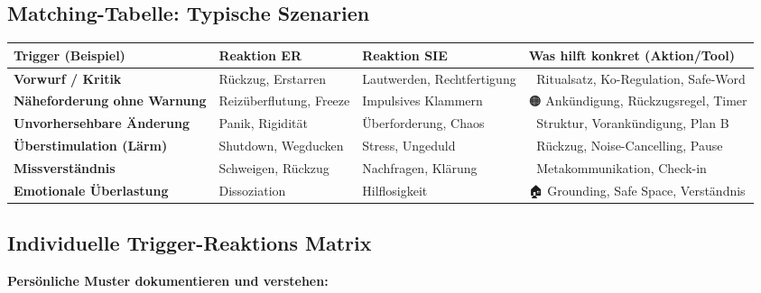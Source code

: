 {\hypertarget{matching-tabelle-typische-szenarien}{%
\subsection{Matching-Tabelle: Typische Szenarien}}\label{matching-tabelle-typische-szenarien}

\begin{center}
\begin{tabular}{|p{3.5cm}|p{3cm}|p{3cm}|p{4.5cm}|}
\hline
\textbf{Trigger (Beispiel)} & \textbf{Reaktion ER} & \textbf{Reaktion SIE} & \textbf{Was hilft konkret (Aktion/Tool)} \\
\hline
\textbf{Vorwurf / Kritik} & Rückzug, Erstarren & Lautwerden, Rechtfertigung & 🔁 Ritualsatz, Ko-Regulation, Safe-Word \\
\hline
\textbf{Näheforderung ohne Warnung} & Reizüberflutung, Freeze & Impulsives Klammern & 🟠 Ankündigung, Rückzugsregel, Timer \\
\hline
\textbf{Unvorhersehbare Änderung} & Panik, Rigidität & Überforderung, Chaos & 🔵 Struktur, Vorankündigung, Plan B \\
\hline
\textbf{Überstimulation (Lärm)} & Shutdown, Wegducken & Stress, Ungeduld & 🔴 Rückzug, Noise-Cancelling, Pause \\
\hline
\textbf{Missverständnis} & Schweigen, Rückzug & Nachfragen, Klärung & 💬 Metakommunikation, Check-in \\
\hline
\textbf{Emotionale Überlastung} & Dissoziation & Hilflosigkeit & 🏠 Grounding, Safe Space, Verständnis \\
\hline
\end{tabular}
\end{center}

\hypertarget{individuelle-trigger-reaktions-matrix}{%
\subsection{Individuelle Trigger-Reaktions Matrix}}\label{individuelle-trigger-reaktions-matrix}

\textbf{Persönliche Muster dokumentieren und verstehen:}

}
